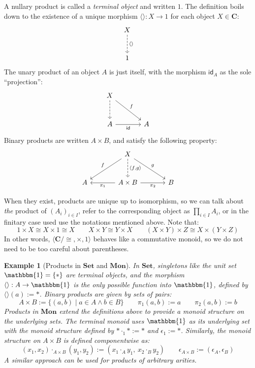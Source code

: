 \documentclass[draft,11pt]{report}
\newtheorem{example}[theorem]{Example}
\theoremstyle{definition}
\newcommand{\kw}[1]{\ensuremath{ \mathsf{#1} }}
\begin{document}
A nullary product is called a \emph{terminal object} and written $1$.
The definition boils down to the existence of
a unique morphism $\langle \rangle : X \rightarrow 1$
for each object $X \in \mathbf{C}$:
\[
  \begin{tikzcd}[sep=large]
    X \ar[d, dashed, "\langle \rangle"] \\ 1
  \end{tikzcd}
\]
The unary product of an object $A$ is just itself,
with the morphism $\kw{id}_A$ as the sole ``projection'':
\[
  \begin{tikzcd}[sep=large]
    X \ar[d, dashed] \ar[dr, "f"] & \\
    A \ar[r, "\kw{id}"'] & A
  \end{tikzcd}
\]
Binary products are written $A \times B$,
and satisfy the following property:
\[
  \begin{tikzcd}[sep=large]
    &
    X \ar[dl, "f"'] \ar[dr, "g"]
      \ar[d, dashed, "{\langle f, g \rangle}"] &
    \\
    A &
    A \times B \ar[l, "\pi_1"] \ar[r, "\pi_2"'] &
    B
  \end{tikzcd}
\]

When they exist, products are unique up to isomorphism,
so we can talk about \emph{the} product of $(A_i)_{i \in I}$,
refer to the corresponding object as
$
  \prod_{i \in I} A_i
$,
or in the finitary case used use the notations
mentioned above.
Note that:
\[
  1 \times X \cong X \times 1 \cong X
  \qquad
  X \times Y \cong Y \times X
  \qquad
  (X \times Y) \times Z \cong X \times (Y \times Z)
\]
In other words,
$\langle \mathbf{C} / {\cong}, {\times}, 1 \rangle$
behaves like a commutative monoid,
so we do not need to be too careful about parentheses.


\begin{example}[Products in $\mathbf{Set}$ and $\mathbf{Mon}$] %
In $\mathbf{Set}$,
singletons like the unit set $\mathbbm{1} = \{ * \}$
are terminal objects,
and the morphism $\langle \rangle : A \rightarrow \mathbbm{1}$
is the only possible function into $\mathbbm{1}$,
defined by $\langle \rangle(a) := *$.
Binary products are given by sets of pairs:
\[
  A \times B := \{ (a, b) \mid a \in A \wedge b \in B \}
  \qquad
  \pi_1(a, b) := a
  \qquad
  \pi_2(a, b) := b
\]
Products in $\mathbf{Mon}$ extend the definitions above
to provide a monoid structure on the underlying sets.
The terminal monoid uses $\mathbbm{1}$ as its underlying set
with the monoid structure
defined by ${*} \cdot_1 {*} := {*}$ and $\epsilon_1 := {*}$.
Similarly,
the monoid structure on $A \times B$ is defined componentwise as:
\[
  (x_1, x_2) \cdot_{A \times B} (y_1, y_2) :=
    (x_1 \cdot_A y_1, \: x_2 \cdot_B y_2)
  \qquad
  \epsilon_{A \times B} :=
    (\epsilon_A, \epsilon_B)
\]
A similar approach can be used for products of arbitrary arities.
\end{example}
\end{document}
